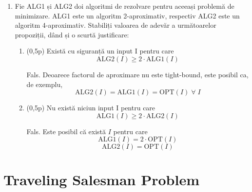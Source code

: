 \documentclass[a4paper,12pt]{article}
\newcommand*{\OPT}{\text{OPT}}
\newcommand*{\ALG}{\text{ALG}}
\begin{document}
\begin{enumerate}
\begin{enumerate}
            \end{enumerate}

      \item
            Fie ALG1 și ALG2 doi algoritmi de rezolvare pentru aceeași problemă
            de minimizare. ALG1 este un algoritm 2-aproximativ, respectiv
            ALG2 este un algoritm 4-aproximativ. Stabiliți valoarea de adevăr a
            următoarelor propoziții, dând și o scurtă justificare:

            \begin{enumerate}

                  \item (0,5p)
                        Există cu siguranță un input I pentru care
                        \[\ALG2(I) \geq 2 \cdot \ALG1(I)\]

                        Fals. Deoarece factorul de aproximare nu este tight-bound, este posibil ca, de exemplu,
                        \[\ALG2(I) = \ALG1(I) = \OPT(I) \;\forall\; I\]

                  \item (0,5p)
                        Nu există niciun input I pentru care
                        \[\ALG1(I) \geq 2 \cdot \ALG2(I)\]

                        Fals. Este posibil că există $I$ pentru care
                        \[\ALG1(I) = 2 \cdot \OPT(I)\]
                        \[\ALG2(I) = \OPT(I)\]

            \end{enumerate}

\end{enumerate}

\section{Traveling Salesman Problem}
\end{document}
